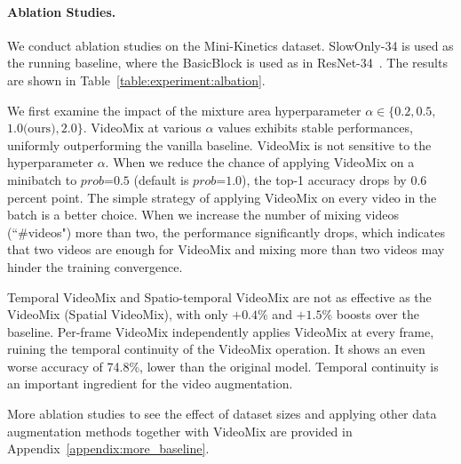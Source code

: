 \paragraph{Ablation Studies.}

We conduct ablation studies on the Mini-Kinetics dataset.
SlowOnly-34 is used as the running baseline, where the BasicBlock is used as in ResNet-34~\cite{resnet}.
The results are shown in Table~\ref{table:experiment:albation}.



We first examine the impact of the mixture area hyperparameter $\alpha \in \{0.2,0.5,$ $1.0\text{(ours)},2.0\}$.
VideoMix at various $\alpha$ values exhibits stable performances, uniformly outperforming the vanilla baseline. VideoMix is not sensitive to the hyperparameter $\alpha$. 
When we reduce the chance of applying VideoMix on a minibatch to $prob$=$0.5$ (default is $prob$=$1.0$), the top-1 accuracy drops by $0.6$ percent point. The simple strategy of applying VideoMix on every video in the batch is a better choice.
When we increase the number of mixing videos (``\#videos") more than two, the performance significantly drops, which indicates that two videos are enough for VideoMix and mixing more than two videos may hinder the training convergence.

Temporal VideoMix and Spatio-temporal VideoMix are not as effective as the VideoMix (Spatial VideoMix), with only $+0.4\%$ and $+1.5\%$ boosts over the baseline.
Per-frame VideoMix independently applies VideoMix at every frame, ruining the temporal continuity of the VideoMix operation. It shows an even worse accuracy of 74.8\%, lower than the original model. Temporal continuity is an important ingredient for the video augmentation.

More ablation studies to see the effect of dataset sizes and applying other data augmentation methods together with VideoMix are provided in Appendix~\ref{appendix:more_baseline}.